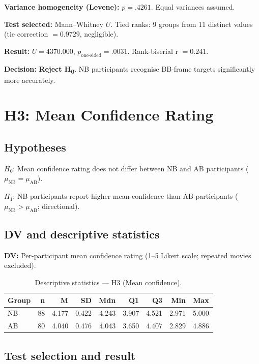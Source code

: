 \documentclass[12pt,a4paper]{article}
\begin{document}
\textbf{Variance homogeneity (Levene):} $p = .4261$. Equal variances assumed.


\textbf{Test selected:} Mann--Whitney $U$. Tied ranks: 9 groups from 11 distinct values (tie correction $= 0.9729$, negligible).

\textbf{Result:} $U = 4370.000$, $p_{\text{one-sided}} = .0031$. Rank-biserial r $= 0.241$.

\textbf{Decision:} \textbf{Reject H\textsubscript{0}}. NB participants recognise BB-frame targets significantly more accurately.


\section{H3: Mean Confidence Rating}

\subsection{Hypotheses}

$H_0$: Mean confidence rating does not differ between NB and AB participants ($\mu_{\text{NB}} = \mu_{\text{AB}}$).

$H_1$: NB participants report higher mean confidence than AB participants ($\mu_{\text{NB}} > \mu_{\text{AB}}$; directional).

\subsection{DV and descriptive statistics}

\textbf{DV:} Per-participant mean confidence rating (1--5 Likert scale; repeated movies excluded).


\begin{table}[h!]
\centering
\small
\begin{tabular}{lrrrrrrrr}
\hline
\textbf{Group} & \textbf{n} & \textbf{M} & \textbf{SD} & \textbf{Mdn} & \textbf{Q1} & \textbf{Q3} & \textbf{Min} & \textbf{Max} \\
\hline
    NB & 88 & 4.177 & 0.422 & 4.243 & 3.907 & 4.521 & 2.971 & 5.000 \\
    AB & 80 & 4.040 & 0.476 & 4.043 & 3.650 & 4.407 & 2.829 & 4.886 \\
\hline
\end{tabular}
\caption{Descriptive statistics --- H3 (Mean confidence).}
\label{tab:h3_desc}
\end{table}

\subsection{Test selection and result}
\end{document}
